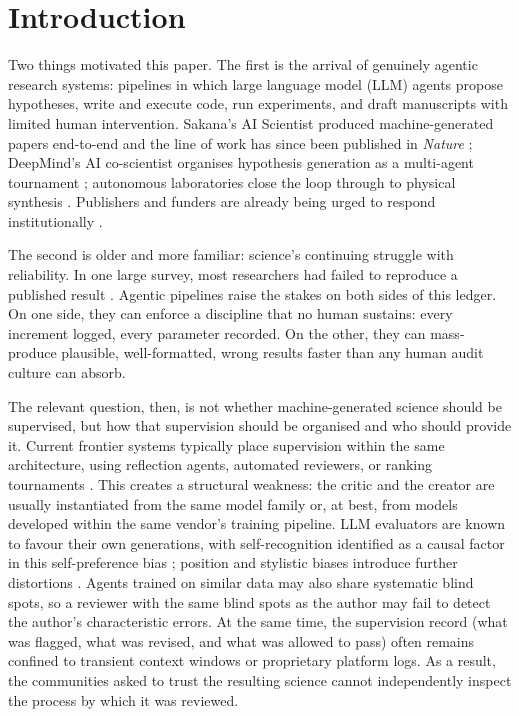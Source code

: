 \documentclass[11pt]{article}
\begin{document}
\section{Introduction}\label{sec:intro}

Two things motivated this paper. The first is the arrival of genuinely agentic research systems: pipelines in which large language model (LLM) agents propose hypotheses, write and execute code, run experiments, and draft manuscripts with limited human intervention. Sakana's AI Scientist produced machine-generated papers end-to-end \cite{lu2024aiscientist,yamada2025aisv2} and the line of work has since been published in \emph{Nature} \cite{lu2026nature}; DeepMind's AI co-scientist organises hypothesis generation as a multi-agent tournament \cite{gottweis2025coscientist}; autonomous laboratories close the loop through to physical synthesis \cite{boiko2023,szymanski2023}. Publishers and funders are already being urged to respond institutionally \cite{naturenews2026}.

The second is older and more familiar: science's continuing struggle with reliability. In one large survey, most researchers had failed to reproduce a published result \cite{baker2016}. Agentic pipelines raise the stakes on both sides of this ledger. On one side, they can enforce a discipline that no human sustains: every increment logged, every parameter recorded. On the other, they can mass-produce plausible, well-formatted, wrong results faster than any human audit culture can absorb.

The relevant question, then, is not whether machine-generated science should be supervised, but how that supervision should be organised and who should provide it. Current frontier systems typically place supervision within the same architecture, using reflection agents, automated reviewers, or ranking tournaments \cite{lu2024aiscientist,gottweis2025coscientist}. This creates a structural weakness: the critic and the creator are usually instantiated from the same model family or, at best, from models developed within the same vendor's training pipeline. LLM evaluators are known to favour their own generations, with self-recognition identified as a causal factor in this self-preference bias \cite{panickssery2024}; position and stylistic biases introduce further distortions \cite{zheng2023}. Agents trained on similar data may also share systematic blind spots, so a reviewer with the same blind spots as the author may fail to detect the author's characteristic errors. At the same time, the supervision record (what was flagged, what was revised, and what was allowed to pass) often remains confined to transient context windows or proprietary platform logs. As a result, the communities asked to trust the resulting science cannot independently inspect the process by which it was reviewed.
\end{document}
